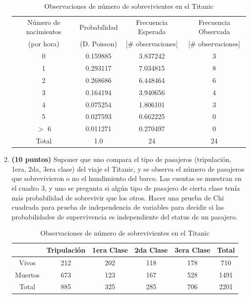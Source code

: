 \documentclass{article}
\begin{document}
\begin{enumerate}
\begin{table}[h!]
\centering
\begin{tabular}{  c c  c  c   } 
 Número de nacimientos & Probabilidad & Frecuencia Esperada & Frecuencia Observada  \\ 
 (por hora) & (D. Poisson) & [\# observaciones]  & [\# observaciones]  \\ \hline
0 & 0.159885 & 3.837242 & 3  \\
1 & 0.293117 & 7.034815 & 8  \\
2 & 0.268686 & 6.448464 & 6 \\
3 & 0.164194 & 3.940656 & 4 \\
4 & 0.075254 & 1.806101 & 3 \\
5 & 0.027593 & 0.662225 & 0 \\
$>$ 6 & 0.011271 & 0.270497 & 0 \\ \hline
Total  & 1.0 & 24 & 24

\end{tabular}
\label{Table2}
\caption{Observaciones de número de sobrevivientes en el Titanic}
\end{table}


\item \textbf{(10 puntos)} Suponer que uno compara el tipo de pasajeros (tripulación, 1era, 2da, 3era clase) del viaje el Titanic, y se observa el número de pasajeros que sobrevivieron o no el hundimiento del barco. Las cuentas se muestran en el cuadro 3, y uno se pregunta si algún tipo de pasajero de cierta clase tenía más probabilidad de sobrevivir que los otros. Hacer una prueba de Chi cuadrada para prueba de independencia de variables para decidir si las probabilidades de supervivencia es independiente del status de un pasajero.




\begin{table}[h!]
\centering
\begin{tabular}{  c | c  c  c  c | c } 
 & Tripulación & 1era Clase & 2da Clase & 3era Clase & Total \\ \hline
 Vivos & 212 & 202 & 118 & 178 & 710 \\
 Muertos & 673 & 123 & 167 & 528 & 1491 \\ \hline
 Total & 885 & 325 & 285 & 706 & 2201

\end{tabular}
\label{Table3}
\caption{Observaciones de número de sobrevivientes en el Titanic}
\end{table}




\end{enumerate}  
  
  
\end{document}
